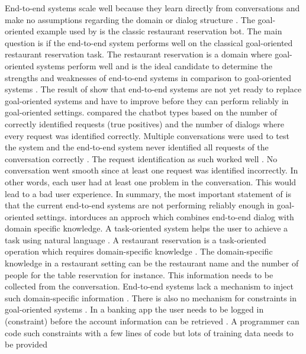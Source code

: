 End-to-end systems scale well because they learn directly from conversations and make 
no assumptions regarding the domain or dialog structure \cite{bordes2016learning}. 
The goal-oriented example used by \citet{bordes2016learning} is the classic restaurant reservation bot.
The main question is if the end-to-end system performs well on the classical goal-oriented restaurant 
reservation task.
The restaurant reservation is a domain where goal-oriented systems perform well and is the ideal candidate
to determine the strengths and weaknesses of end-to-end systems in comparison to goal-oriented systems \cite{bordes2016learning}.
The result of \citet{bordes2016learning} show that end-to-end systems are not yet ready to replace goal-oriented 
systems and have to improve before they can perform reliably in goal-oriented settings. 
\citet{bordes2016learning} compared the chatbot types based on the number of correctly identified requests (true positives)
and the number of dialogs where every request was identified correctly.
Multiple conversations were used to test the system and the end-to-end system never identified 
all requests of the conversation correctly \cite{bordes2016learning}.
The request identification as such worked well \cite{bordes2016learning}.
No conversation went smooth since at least one request was identified incorrectly.
In other words, each user had at least one problem in the conversation.
This would lead to a bad user experience. 
In summary, the most important statement of \citet{bordes2016learning} is that the current end-to-end systems are
not performing reliably enough in goal-oriented settings.
\citet{williams2017hybrid} intorduces an approch which combines end-to-end dialog with domain specific knowledge.
A task-oriented system helps the user to achieve a task using natural language \cite{williams2017hybrid}.
A restaurant reservation is a task-oriented operation which requires domain-specific knowledge \cite{williams2017hybrid}.
The domain-specific knowledge in a restaurant setting can be the restaurant name and the number of people for 
the table reservation for instance. 
This information needs to be collected from the conversation.
End-to-end systems lack a mechanism to inject such domain-specific information \cite{williams2017hybrid}.
There is also no mechanism for constraints in goal-oriented systems \cite{williams2017hybrid}.
In a banking app the user needs to be logged in (constraint) before the account information can be retrieved \cite{williams2017hybrid}.
A programmer can code such constraints with a few lines of code but lots of training data needs to be provided 
